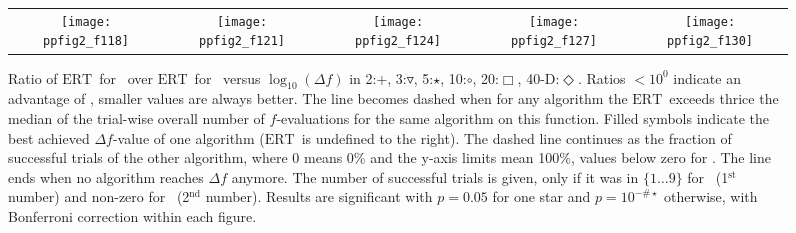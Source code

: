 \documentclass{article}
\newcommand{\ERT}{\ensuremath{\mathrm{ERT}}}
\newcommand{\Df}{\ensuremath{\Delta f}}
\newcommand{\bbobdatapath}{ppdata/} %
\begin{document}
\begin{figure}
\begin{tabular}{@{}c@{}c@{}c@{}c@{}c@{}}
\texttt{[image: ppfig2\_f118]}&
\texttt{[image: ppfig2\_f121]}&
\texttt{[image: ppfig2\_f124]}&
\texttt{[image: ppfig2\_f127]}&
\texttt{[image: ppfig2\_f130]}
\end{tabular}
\vspace*{-0.2cm}
\caption{\label{fig:ERTratiographs}Ratio of \ERT\ for \algorithmB\ over \ERT\ for
\algorithmA\ versus $\log_{10}(\Df)$ in
  2:{\color{cyan}+},
  3:{\color{green!45!black}$\triangledown$},
  5:{\color{blue}$\star$}, 
 10:$\circ$, 
 20:{\color{red}$\Box$}, 
 40-D:{\color{magenta}$\Diamond$}.
Ratios $<10^0$ indicate an advantage of \algorithmB, smaller
values are always better. The line becomes dashed when for any algorithm the \ERT\ exceeds thrice the median
of the trial-wise overall number of $f$-evaluations for the same algorithm on this function.
Filled symbols indicate the best achieved $\Df$-value of one algorithm (\ERT\ is undefined to the right).
The dashed line continues as the fraction of successful trials of the other
algorithm, where 0 means 0\% and the y-axis limits mean 100\%, values below
zero for \algorithmB. The line ends when no algorithm reaches $\Df$ anymore. 
The number of successful trials is given, only if it was in $\{1\dots9\}$ for
\algorithmB\ (1$^{\textrm{st}}$ number) and non-zero for \algorithmA\ (2$^{\textrm{nd}}$ number).
Results are significant with $p=0.05$ for one star and $p=10^{-\#\star}$
otherwise, with Bonferroni correction within each figure.}
\end{figure}
\begin{table}
\centering
\tiny

\caption{\label{tab:ERTs05Da} 
}
\end{table}
\end{document}
